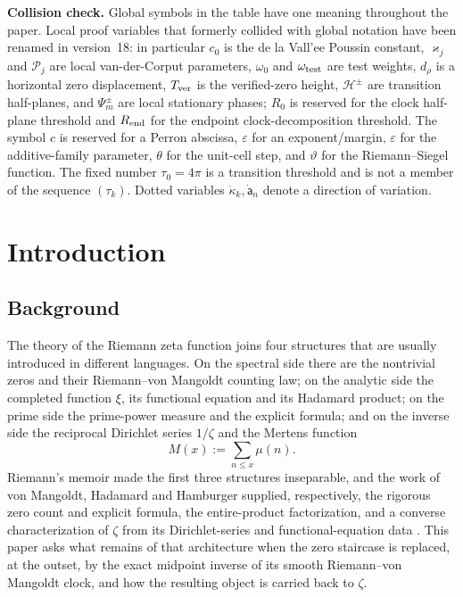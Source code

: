 \documentclass[11pt,reqno]{amsart}
\makeatletter
\let\CG@origcite\cite
\renewcommand*{\cite}[2][]{\def\CG@citekey{#2}%
  \ifx\relax#1\relax\CG@origcite{#2}\else\CG@origcite[#1]{#2}\fi}
\numberwithin{equation}{section}
\theoremstyle{plain}
\theoremstyle{definition}
\theoremstyle{remark}
\newcommand{\eps}{\varepsilon}
\makeatother
\begin{document}
\medskip\noindent\textbf{Collision check.}
Global symbols in the table have one meaning throughout the paper.  Local proof variables that formerly collided with global notation have been renamed in version~18: in particular $c_0$ is the de la Vall'ee Poussin constant, $\varkappa_j$ and $\mathcal P_j$ are local van-der-Corput parameters, $\omega_0$ and $\omega_{\rm test}$ are test weights, $d_\rho$ is a horizontal zero displacement, $T_{\rm ver}$ is the verified-zero height, $\mathcal H^\pm$ are transition half-planes, and $\Psi_m^\pm$ are local stationary phases; $R_0$ is reserved for the clock half-plane threshold and $R_{\rm end}$ for the endpoint clock-decomposition threshold.  The symbol $c$ is reserved for a Perron abscissa, $\eps$ for an exponent/margin, $\varepsilon$ for the additive-family parameter, $\theta$ for the unit-cell step, and $\vartheta$ for the Riemann--Siegel function.  The fixed number $\tau_0=4\pi$ is a transition threshold and is not a member of the sequence $(\tau_k)$.  Dotted variables $\dot\kappa_k,\dot{\mathsf a}_n$ denote a direction of variation.

\section{Introduction}
\label{sec:introduction}

\subsection{Background}
\label{subsec:background}

The theory of the Riemann zeta function joins four structures that are usually introduced in different languages.  On the spectral side there are the nontrivial zeros and their Riemann--von Mangoldt counting law; on the analytic side the completed function $\xi$, its functional equation and its Hadamard product; on the prime side the prime-power measure and the explicit formula; and on the inverse side the reciprocal Dirichlet series $1/\zeta$ and the Mertens function
\begin{equation}\label{eq:mertens-def}
 M(x):=\sum_{n\le x}\mu(n).
\end{equation}
Riemann's memoir made the first three structures inseparable, and the work of von Mangoldt, Hadamard and Hamburger supplied, respectively, the rigorous zero count and explicit formula, the entire-product factorization, and a converse characterization of $\zeta$ from its Dirichlet-series and functional-equation data \cite{Riemann1859,vonMangoldt1895,Hadamard1896,Hamburger1921,Titchmarsh1986,Edwards1974}.  This paper asks what remains of that architecture when the zero staircase is replaced, at the outset, by the exact midpoint inverse of its smooth Riemann--von Mangoldt clock, and how the resulting object is carried back to $\zeta$.
\end{document}
